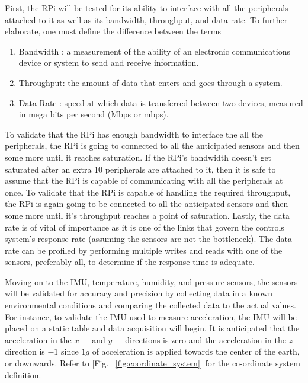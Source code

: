 First, the RPi will be tested for its ability to interface with all the peripherals attached to it as well as its bandwidth, throughput, and data rate. To further elaborate, one must define the difference between the terms %

\begin{enumerate}
    \item Bandwidth : a measurement of the ability of an electronic communications device or system to send and receive information.
    \item Throughput: the amount of data that enters and goes through a system.
    \item Data Rate : speed at which data is transferred between two devices, measured in mega bits per second (Mbps or mbps).
\end{enumerate}

To validate that the RPi has enough bandwidth to interface the all the peripherals, the RPi is going to connected to all the anticipated sensors and then some more until it reaches saturation. If the RPi's bandwidth doesn't get saturated after an extra 10 peripherals are attached to it, then it is safe to assume that the RPi is capable of communicating with all the peripherals at once.
To validate that the RPi is capable of handling the required throughput, the RPi is again going to be connected to all the anticipated sensors and then some more until it's throughput reaches a point of saturation.
Lastly, the data rate is of vital of importance as it is one of the links that govern the controls system's response rate (assuming the sensors are not the bottleneck). The data rate can be profiled by performing multiple writes and reads with one of the sensors, preferably all, to determine if the response time is adequate.

Moving on to the IMU, temperature, humidity, and pressure sensors, the sensors will be validated for accuracy and precision by collecting data in a known environmental conditions and comparing the collected data to the actual values. For instance, to validate the IMU used to measure acceleration, the IMU will be placed on a static table and data acquisition will begin. It is anticipated that the acceleration in the $x-$ and $y-$ directions is zero and the acceleration in the $z-$ direction is $-1$ since $1g$ of acceleration is applied towards the center of the earth, or downwards. Refer to [Fig. ~\ref{fig:coordinate_system}] for the co-ordinate system definition.

